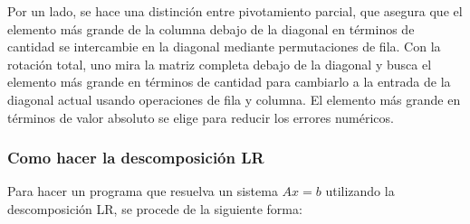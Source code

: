 Por un lado, se hace una distinción entre pivotamiento parcial, que asegura que el
elemento más grande de la columna debajo de la diagonal en términos de cantidad se
intercambie en la diagonal mediante permutaciones de fila. Con la rotación total, uno mira la
matriz completa debajo de la diagonal y busca el elemento más grande en términos de
cantidad para cambiarlo a la entrada de la diagonal actual usando operaciones de fila y
columna. El elemento más grande en términos de valor absoluto se elige para reducir los
errores numéricos.

\subsubsection{Como hacer la descomposición LR}
Para hacer un programa que resuelva un sistema $Ax=b$ utilizando la descomposición 
LR, se procede de la siguiente forma:

